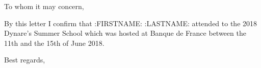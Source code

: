 \documentclass{letter}
\begin{document}
\begin{letter}{}
  
  \bigskip
  \bigskip
  \bigskip
  
\opening{To whom it may concern,}

\thispagestyle{fancy}

  \bigskip
  \bigskip
  \bigskip

By this letter I confirm that :{FIRSTNAME}: :{LASTNAME}: attended to the 2018 Dynare's Summer School which was hosted at Banque de France between the 11th and the 15th of June 2018.

  \bigskip
  \bigskip
  \bigskip
  \bigskip
  \bigskip
  \bigskip
  \bigskip
  
\closing{Best regards,\\
 \\
}

\end{letter}
\end{document}
